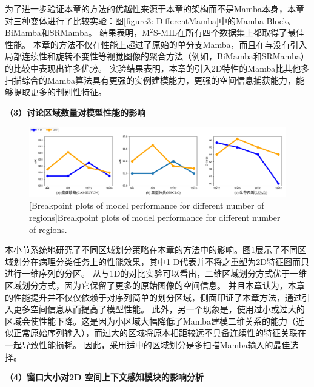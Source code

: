 为了进一步验证本章的方法的优越性来源于本章的架构而不是Mamba本身，本章对三种变体进行了比较实验：图\ref{figure3: DifferentMamba}中的Mamba Block、BiMamba和SRMamba。
结果表明，M$^2$S-MIL在所有四个数据集上都取得了最佳性能。
本章的方法不仅在性能上超过了原始的单分支Mamba，而且在与没有引入局部连续性和旋转不变性等视觉图像的聚合方法（例如，BiMamba和SRMamba）的比较中表现出许多优势。
实验结果表明，本章的引入2D特性的Mamba比其他多扫描综合的Mamba算法具有更强的实例建模能力，更强的空间信息捕获能力，能够提取更多的判别性特征。



\textbf{（3）讨论区域数量对模型性能的影响}

\begin{figure}[ht]
  \centering
  \includegraphics[width=1.0\columnwidth]{figures/区域个数.png}
  [Breakpoint plots of model performance for different number of regions]{Breakpoint plots of model performance for different number of regions.}
  \label{figure3: NumOfRegion}
\end{figure}

本小节系统地研究了不同区域划分策略在本章的方法中的影响。图\ref{figure3: NumOfRegion}展示了不同区域划分在病理分类任务上的性能效果，其中1-D代表并不将之重塑为2D特征图而只进行一维序列的分区。
从与1D的对比实验可以看出，二维区域划分方式优于一维区域划分方式，因为它保留了更多的原始图像的空间信息。
并且本章认为，本章的性能提升并不仅仅依赖于对序列简单的划分区域，侧面印证了本章方法，通过引入更多空间信息从而提高了模型性能。
此外，另一个现象是，使用过小或过大的区域会使性能下降。这是因为小区域大幅降低了Mamba建模二维关系的能力（近似正常原始序列输入），而过大的区域将原本相距较远不具备连续性的特征关联在一起导致性能损耗。
因此，采用适中的区域划分是多扫描Mamba输入的最佳选择。


\textbf{（4）窗口大小对2D 空间上下文感知模块的影响分析}

